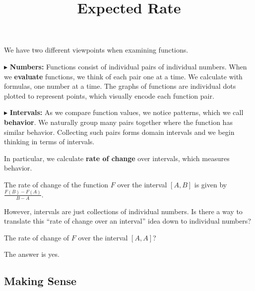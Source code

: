 \documentclass{ximera}
\title{Expected Rate}
\begin{document}
\begin{abstract}
\end{abstract}
\maketitle






We have two different viewpoints when examining functions.


$\blacktriangleright$ \textbf{Numbers:}  Functions consist of individual pairs of individual numbers.  When we \textbf{\textcolor{purple!85!blue}{evaluate}} functions, we think of each pair one at a time.  We calculate with formulas, one number at a time. The graphs of functions are individual dots plotted to represent points, which visually encode each function pair. 







$\blacktriangleright$ \textbf{Intervals:} As we compare function values, we notice patterns, which we call \textbf{\textcolor{purple!85!blue}{behavior}}. We naturally group many pairs together where the function has similar behavior.  Collecting such pairs forms domain intervals and we begin thinking in terms of intervals.





In particular, we calculate \textbf{\textcolor{blue!55!black}{rate of change}} over intervals, which measures behavior. 



The rate of change of the function $F$ over the interval $[A, B]$ is given by $\frac{F(B) - F(A)}{B - A}$.




However, intervals are just collections of individual numbers.  Is there a way to translate this ``rate of change over an interval'' idea down to individual numbers?

The rate of change of $F$ over the interval $[A, A]$?


The answer is yes.  









\subsection*{Making Sense}
\end{document}
